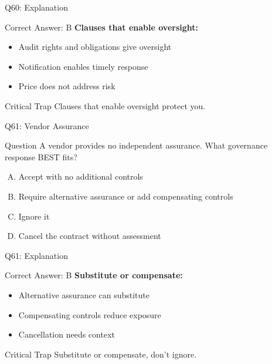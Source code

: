 \documentclass{beamer}
\begin{document}
	\begin{frame}{Q60: Explanation}
		\begin{block}{Correct Answer: B}
			\textbf{Clauses that enable oversight:}
			\begin{itemize}
				\item Audit rights and obligations give oversight
				\item Notification enables timely response
				\item Price does not address risk
			\end{itemize}
		\end{block}
		\begin{alertblock}{Critical Trap}
			Clauses that enable oversight protect you.
		\end{alertblock}
	\end{frame}
	
	\begin{frame}{Q61: Vendor Assurance}
		\begin{block}{Question}
			A vendor provides no independent assurance. What governance response BEST fits?
		\end{block}
		\begin{enumerate}[(A)]
			\item Accept with no additional controls
			\item Require alternative assurance or add compensating controls
			\item Ignore it
			\item Cancel the contract without assessment
		\end{enumerate}
	\end{frame}
	
	\begin{frame}{Q61: Explanation}
		\begin{block}{Correct Answer: B}
			\textbf{Substitute or compensate:}
			\begin{itemize}
				\item Alternative assurance can substitute
				\item Compensating controls reduce exposure
				\item Cancellation needs context
			\end{itemize}
		\end{block}
		\begin{alertblock}{Critical Trap}
			Substitute or compensate, don't ignore.
		\end{alertblock}
	\end{frame}
	
\end{document}
